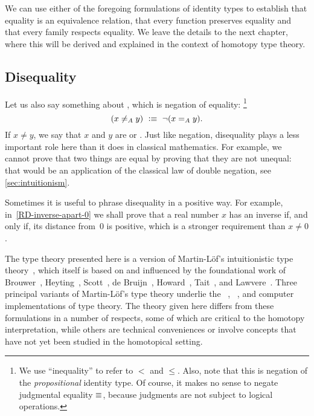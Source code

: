 We can use either of the foregoing formulations of identity types
to establish that equality is an equivalence relation, that every function preserves equality and that every family respects equality. We leave the details to the next chapter, where this will be derived  and explained in the context of homotopy type theory.

\subsection{Disequality}
\label{sec:disequality}

Let us also say something about ,
%
which is negation of equality:%
\footnote{We use ``inequality''
  to refer to $<$ and $\leq$. Also, note that this is negation of the \emph{propositional} identity type.
Of course, it makes no sense to negate judgmental equality $\jdeq$, because judgments are not subject to logical operations.}
%
\begin{equation*}
  (x \neq_A y) \ \defeq\ \lnot (\id[A]{x}{y}).
\end{equation*}
If $x\neq y$, we say that $x$ and $y$ are 
%
or .
%
Just like negation, disequality plays a less important role here than it does in classical
mathematics. For example, we cannot prove that two things are equal by proving that they
are not unequal: that would be an application of the classical law of double negation, see \autoref{sec:intuitionism}.

Sometimes it is useful to phrase disequality in a positive way. For example,
in~\autoref{RD-inverse-apart-0} we shall prove that a real number $x$ has an inverse if,
and only if, its distance from~$0$ is positive, which is a stronger requirement than $x
\neq 0$.

%

\sectionNotes

The type theory presented here is a version of Martin-L\"{o}f's intuitionistic type 
theory~\cite{Martin-Lof-1972,Martin-Lof-1973,Martin-Lof-1979,martin-lof:bibliopolis}, which itself is based on and influenced 
by the foundational work of Brouwer~\cite{beeson}, Heyting~\cite{heyting1966intuitionism}, Scott~\cite{scott70}, de 
Bruijn~\cite{deBruijn-1973}, Howard~\cite{howard:pat}, Tait~\cite{Tait-1966,Tait-1968}, and Lawvere~\cite{lawvere:adjinfound}.
%
Three principal variants of Martin-L\"{o}f's type theory underlie the \NuPRL~\cite{constable+86nuprl-book}, \Coq~\cite{Coq}, and 
\Agda \cite{norell2007towards} computer implementations of type theory.  The theory given here differs from these formulations in a number 
of respects, some of which are critical to the homotopy interpretation, while others are technical conveniences or involve concepts that 
have not yet been studied in the homotopical setting.

